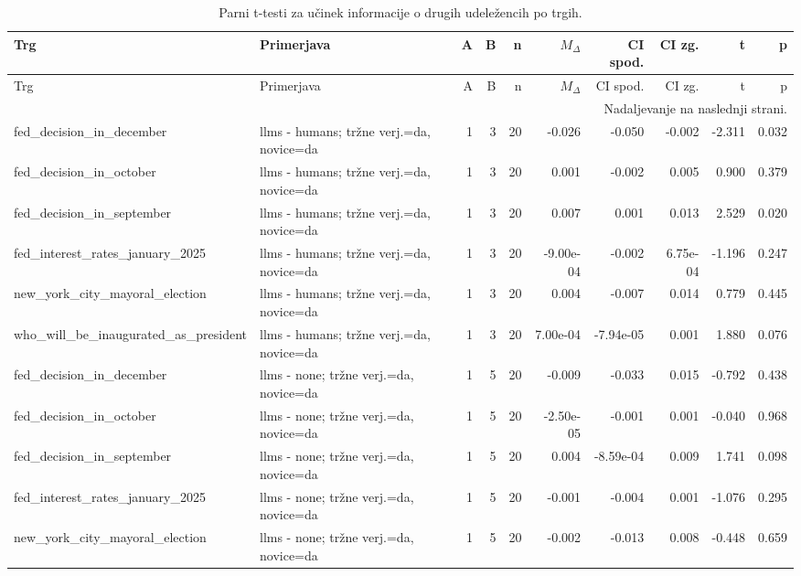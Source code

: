 \scriptsize
\setlength{\LTleft}{0pt}
\setlength{\LTright}{0pt}
\begin{longtable}{llrrrrrrrr}
\caption{Parni t-testi za učinek informacije o drugih udeležencih po trgih.}\label{tab:ttests-trader}\\
\toprule
Trg & Primerjava & A & B & n & $M_\Delta$ & CI spod. & CI zg. & t & p \\
\midrule
\endfirsthead
\toprule
Trg & Primerjava & A & B & n & $M_\Delta$ & CI spod. & CI zg. & t & p \\
\midrule
\endhead
\midrule
\multicolumn{10}{r}{Nadaljevanje na naslednji strani.} \\
\endfoot
\bottomrule
\endlastfoot
fed\_decision\_in\_december & llms - humans; tržne verj.=da, novice=da & 1 & 3 & 20 & -0.026 & -0.050 & -0.002 & -2.311 & 0.032 \\
fed\_decision\_in\_october & llms - humans; tržne verj.=da, novice=da & 1 & 3 & 20 & 0.001 & -0.002 & 0.005 & 0.900 & 0.379 \\
fed\_decision\_in\_september & llms - humans; tržne verj.=da, novice=da & 1 & 3 & 20 & 0.007 & 0.001 & 0.013 & 2.529 & 0.020 \\
fed\_interest\_rates\_january\_2025 & llms - humans; tržne verj.=da, novice=da & 1 & 3 & 20 & -9.00e-04 & -0.002 & 6.75e-04 & -1.196 & 0.247 \\
new\_york\_city\_mayoral\_election & llms - humans; tržne verj.=da, novice=da & 1 & 3 & 20 & 0.004 & -0.007 & 0.014 & 0.779 & 0.445 \\
who\_will\_be\_inaugurated\_as\_president & llms - humans; tržne verj.=da, novice=da & 1 & 3 & 20 & 7.00e-04 & -7.94e-05 & 0.001 & 1.880 & 0.076 \\
fed\_decision\_in\_december & llms - none; tržne verj.=da, novice=da & 1 & 5 & 20 & -0.009 & -0.033 & 0.015 & -0.792 & 0.438 \\
fed\_decision\_in\_october & llms - none; tržne verj.=da, novice=da & 1 & 5 & 20 & -2.50e-05 & -0.001 & 0.001 & -0.040 & 0.968 \\
fed\_decision\_in\_september & llms - none; tržne verj.=da, novice=da & 1 & 5 & 20 & 0.004 & -8.59e-04 & 0.009 & 1.741 & 0.098 \\
fed\_interest\_rates\_january\_2025 & llms - none; tržne verj.=da, novice=da & 1 & 5 & 20 & -0.001 & -0.004 & 0.001 & -1.076 & 0.295 \\
new\_york\_city\_mayoral\_election & llms - none; tržne verj.=da, novice=da & 1 & 5 & 20 & -0.002 & -0.013 & 0.008 & -0.448 & 0.659 \\

\end{longtable}
